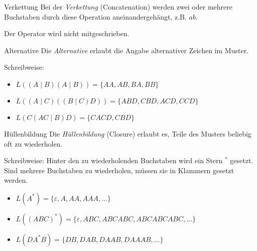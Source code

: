 \begin{defi}{Verkettung}
    Bei der \emph{Verkettung} (Concatenation) werden zwei oder mehrere Buchstaben durch diese Operation aneinandergehängt, z.B. $ab$.

    Der Operator wird nicht mitgeschrieben.
\end{defi}

\begin{defi}{Alternative}
    Die \emph{Alternative} erlaubt die Angabe alternativer Zeichen im Muster.

    Schreibweise:
    \begin{itemize}
        \item $L((A \mid B)(A \mid B)) = \{AA, AB, BA, BB\}$
        \item $L((A \mid C)((B \mid C)D)) = \{ABD, CBD, ACD, CCD\}$
        \item $L(C(AC\mid B)D) = \{CACD, CBD\}$
    \end{itemize}
\end{defi}

\begin{defi}{Hüllenbildung}
    Die \emph{Hüllenbildung} (Closure) erlaubt es, Teile des Musters beliebig oft zu wiederholen.

    Schreibweise: Hinter den zu wiederholenden Buchstaben wird ein Stern $^*$ gesetzt.
    Sind mehrere Buchstaben zu wiederholen, müssen sie in Klammern gesetzt werden.
    \begin{itemize}
        \item $L(A^*) = \{\varepsilon, A, AA, AAA, \ldots\}$
        \item $L((ABC)^*) = \{\varepsilon, ABC, ABCABC, ABCABCABC, \ldots\}$
        \item $L(DA^*B) = \{DB, DAB, DAAB, DAAAB, \ldots\}$
    \end{itemize}
\end{defi}

